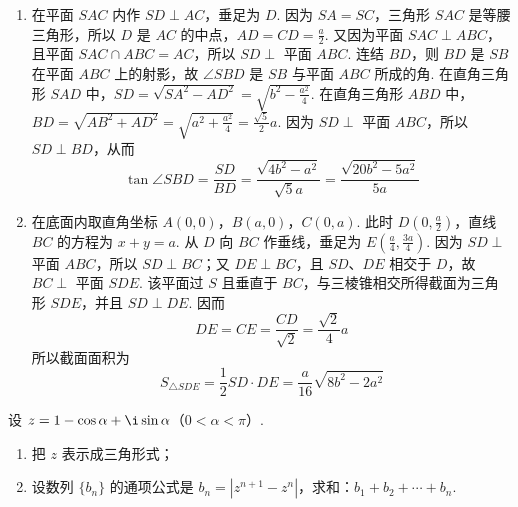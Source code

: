 \begin{solution}
\begin{enumerate}
\item 在平面 \(SAC\) 内作 \(SD\perp AC\)，垂足为 \(D\). 因为 \(SA=SC\)，三角形 \(SAC\) 是等腰三角形，所以 \(D\) 是 \(AC\) 的中点，\(AD=CD=\frac{a}{2}\). 又因为平面 \(SAC\perp ABC\)，且平面 \(SAC\cap ABC=AC\)，所以 \(SD\perp\) 平面 \(ABC\). 连结 \(BD\)，则 \(BD\) 是 \(SB\) 在平面 \(ABC\) 上的射影，故 \(\angle SBD\) 是 \(SB\) 与平面 \(ABC\) 所成的角. 在直角三角形 \(SAD\) 中，\(SD=\sqrt{SA^2-AD^2}=\sqrt{b^2-\frac{a^2}{4}}\). 在直角三角形 \(ABD\) 中，\(BD=\sqrt{AB^2+AD^2}=\sqrt{a^2+\frac{a^2}{4}}=\frac{\sqrt{5}}{2}a\). 因为 \(SD\perp\) 平面 \(ABC\)，所以 \(SD\perp BD\)，从而
\[
\tan\angle SBD=\frac{SD}{BD}=\frac{\sqrt{4b^2-a^2}}{\sqrt{5}a}=\frac{\sqrt{20b^2-5a^2}}{5a}
\]

\item 在底面内取直角坐标 \(A(0,0)\)，\(B(a,0)\)，\(C(0,a)\). 此时 \(D\left(0,\frac{a}{2}\right)\)，直线 \(BC\) 的方程为 \(x+y=a\). 从 \(D\) 向 \(BC\) 作垂线，垂足为 \(E\left(\frac{a}{4},\frac{3a}{4}\right)\). 因为 \(SD\perp\) 平面 \(ABC\)，所以 \(SD\perp BC\)；又 \(DE\perp BC\)，且 \(SD\)、\(DE\) 相交于 \(D\)，故 \(BC\perp\) 平面 \(SDE\). 该平面过 \(S\) 且垂直于 \(BC\)，与三棱锥相交所得截面为三角形 \(SDE\)，并且 \(SD\perp DE\). 因而
\[
DE=CE=\frac{CD}{\sqrt{2}}=\frac{\sqrt{2}}{4}a
\]
所以截面面积为
\[
S_{\triangle SDE}=\frac{1}{2}SD\cdot DE=\frac{a}{16}\sqrt{8b^2-2a^2}
\]
\end{enumerate}

\end{solution}


\begin{problem}

设 \(z = 1 - \cos \alpha + \i\sin \alpha\)（\(0 < \alpha < \pi\)）.

\begin{enumerate}
\item 把 \(z\) 表示成三角形式；
\item 设数列 \(\{b_n\}\) 的通项公式是 \(b_n = |z^{n+1} - z^n|\)，求和：\(b_1 + b_2 + \cdots + b_n\).
\end{enumerate}
\end{problem}

